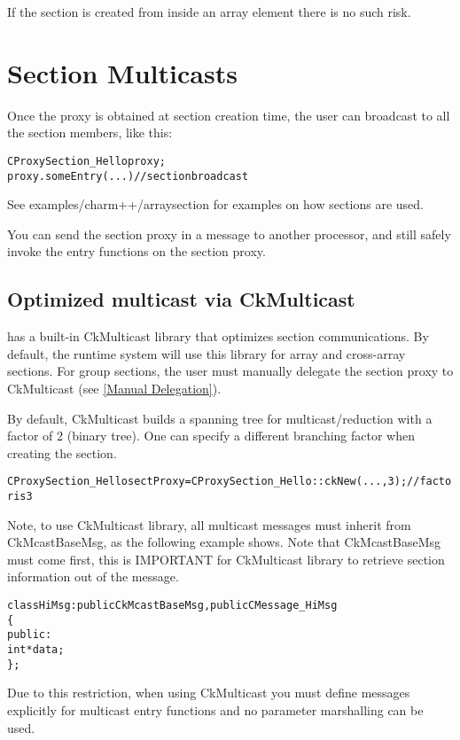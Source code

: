 If the section is created from inside an array element there is no such risk.

\section{Section Multicasts}
\label {array_section_multicast}

Once the proxy is obtained at section creation time, the user can broadcast to all the
section members, like this:

\begin{alltt}
  CProxySection_Hello proxy;
  proxy.someEntry(...)          // section broadcast
\end{alltt}

See examples/charm++/arraysection for examples on how sections are used.

You can send the section proxy in a message to another processor, and still
safely invoke the entry functions on the section proxy.

\subsection{Optimized multicast via CkMulticast}

\charmpp{} has a built-in CkMulticast library that optimizes section communications.
By default, the \charmpp{} runtime system will use this library for array and cross-array sections. For group sections,
the user must manually delegate the section proxy to CkMulticast (see \ref{Manual Delegation}).

By default, CkMulticast builds a spanning tree for multicast/reduction
with a factor of 2 (binary tree). One can specify a different branching factor when creating the
section.
\begin{alltt}
  CProxySection_Hello sectProxy = CProxySection_Hello::ckNew(..., 3); // factor is 3
\end{alltt}

Note, to use CkMulticast library, all multicast messages must inherit from
CkMcastBaseMsg, as the following example shows.
Note that CkMcastBaseMsg must come first, this is IMPORTANT for CkMulticast
library to retrieve section information out of the message.


\begin{alltt}
class HiMsg : public CkMcastBaseMsg, public CMessage_HiMsg
\{
public:
  int *data;
\};
\end{alltt}

Due to this restriction, when using CkMulticast you must define messages explicitly for multicast
entry functions and no parameter marshalling can be used.

